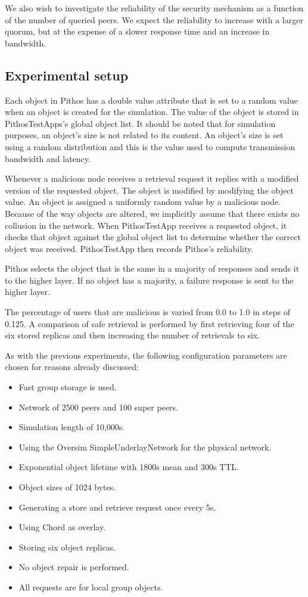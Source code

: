 We also wish to investigate the reliability of the security mechanism as a function of the number of queried peers. We expect the reliability to increase with a larger quorum, but at the expense of a slower response time and an increase in bandwidth.

\subsection{Experimental setup}

Each object in Pithos has a double value attribute that is set to a random value when an object is created for the simulation. The value of the object is stored in PithosTestApps's global object list. It should be noted that for simulation purposes, an object's size is not related to its content. An object's size is set using a random distribution and this is the value used to compute transmission bandwidth and latency.

Whenever a malicious node receives a retrieval request it replies with a modified version of the requested object. The object is modified by modifying the object value. An object is assigned a uniformly random value by a malicious node. Because of the way objects are altered, we implicitly assume that there exists no collusion in the network. When PithosTestApp receives a requested object, it checks that object against the global object list to determine whether the correct object was received. PithosTestApp then records Pithos's reliability.

Pithos selects the object that is the same in a majority of responses and sends it to the higher layer. If no object has a majority, a failure response is sent to the higher layer.

The percentage of users that are malicious is varied from 0.0 to 1.0 in steps of 0.125. A comparison of safe retrieval is performed by first retrieving four of the six stored replicas and then increasing the number of retrievals to six.

As with the previous experiments, the following configuration parameters are chosen for reasons already discussed:
%
\begin{itemize}
\item Fast group storage is used.
\item Network of 2500 peers and 100 super peers.
\item Simulation length of 10,000s.
\item Using the Oversim SimpleUnderlayNetwork for the physical network.
\item Exponential object lifetime with 1800s mean and 300s TTL.
\item Object sizes of 1024 bytes.
\item Generating a store and retrieve request once every 5s.
\item Using Chord as overlay.
\item Storing six object replicas.
\item No object repair is performed.
\item All requests are for local group objects.
\end{itemize}

